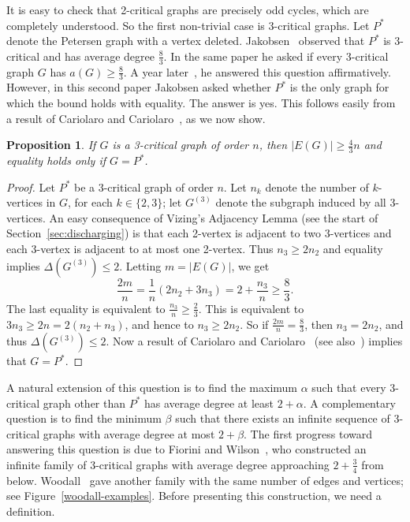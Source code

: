 \documentclass[12pt]{article}
\theoremstyle{plain}
\newtheorem{prop}{Proposition}
\theoremstyle{definition}
\theoremstyle{remark}
\begin{document}
It is easy to check that
2-critical graphs are precisely odd cycles, which are completely understood.  So
the first non-trivial case is 3-critical graphs.
Let $P^*$ denote the Petersen graph with a vertex deleted.
Jakobsen~\cite{Jakobsen73} observed that $P^*$ is 3-critical and has average
degree $\frac83$.
In the same paper he asked if every 3-critical graph $G$ has $a(G)\ge \frac83$. 
A year later~\cite{Jakobsen74}, he answered this question
affirmatively. 
However, in this second paper Jakobsen asked whether 
$P^*$ is the only graph for which the bound holds with equality.
The answer is yes.  This follows easily from a result of Cariolaro and
Cariolaro~\cite{C&C}, as we now show.

\begin{prop}
If $G$ is a 3-critical graph of order $n$, then $|E(G)|\ge \frac43n$ and
equality holds only if $G=P^*$.
\end{prop}
\begin{proof}
Let $P^*$ be a 3-critical graph of order $n$.  Let $n_k$ denote the number of
$k$-vertices in $G$, for each $k\in\{2,3\}$; let $G^{(3)}$ denote the subgraph
induced by all 3-vertices.  An easy consequence of Vizing's Adjacency Lemma (see
the start of Section~\ref{sec:discharging}) is
that each 2-vertex is adjacent to two 3-vertices and each 3-vertex is adjacent
to at most one 2-vertex.  Thus $n_3\ge 2n_2$ and equality implies
$\Delta(G^{(3)})\le 2$.  Letting $m=|E(G)|$, we get
$$
\frac{2m}{n}=\frac1n(2n_2+3n_3)=2+\frac{n_3}n\ge \frac83.
$$
The last equality is equivalent to $\frac{n_3}n\ge \frac23$.  This is equivalent
to $3n_3\ge 2n=2(n_2+n_3)$, and hence to $n_3\ge 2n_2$.  So if
$\frac{2m}n=\frac83$, then $n_3=2n_2$, and thus $\Delta(G^{(3)})\le 2$.  Now a
result of Cariolaro and Cariolaro~\cite{C&C} (see
also~\cite[Theorem~4.11]{StiebitzSTF12}) implies that $G=P^*$.
\end{proof}

A natural extension of this question is
to find the maximum $\alpha$ such that every 3-critical graph other than
$P^*$ has average degree at least $2+\alpha$.  A complementary question 
is to find the minimum $\beta$ such that
there exists an infinite sequence of 3-critical
graphs with average degree at most $2+\beta$.  The first progress toward
answering this question is due to Fiorini and Wilson~\cite[p. 43]{FioriniWilson},
who constructed an infinite family of 3-critical graphs with average degree
approaching $2+\frac34$ from below.  
Woodall~\cite[p. 815]{Woodall08} gave another family with the same number of
edges and vertices; see Figure~\ref{woodall-examples}.
Before presenting this construction, we need a definition.
\end{document}
